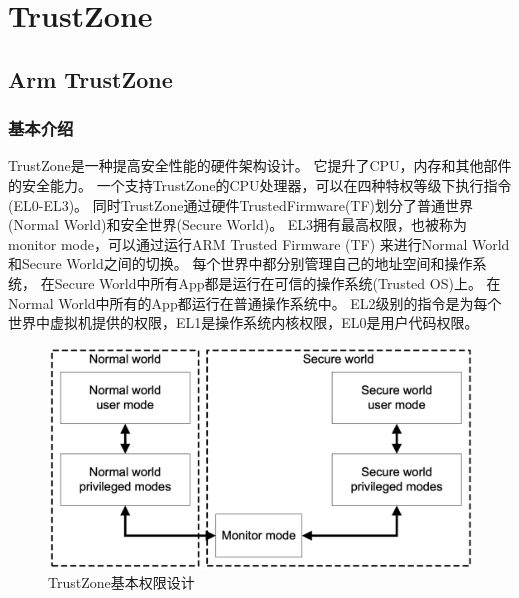 
\chapter{TrustZone} %

\label{Chapter2} %


%



\section{Arm TrustZone}

\subsection{基本介绍} 
TrustZone是一种提高安全性能的硬件架构设计。
它提升了CPU，内存和其他部件的安全能力。
一个支持TrustZone的CPU处理器，可以在四种特权等级下执行指令(EL0-EL3)。
同时TrustZone通过硬件TrustedFirmware(TF)划分了普通世界(Normal World)和安全世界(Secure World)。
EL3拥有最高权限，也被称为monitor mode，可以通过运行ARM Trusted Firmware (TF) 来进行Normal World和Secure World之间的切换。
每个世界中都分别管理自己的地址空间和操作系统，
在Secure World中所有App都是运行在可信的操作系统(Trusted OS)上。
在Normal World中所有的App都运行在普通操作系统中。
EL2级别的指令是为每个世界中虚拟机提供的权限，EL1是操作系统内核权限，EL0是用户代码权限。


\begin{figure}
    \centering
    \includegraphics[scale=0.45]{Figures/trustzone/trustzone.png}
    \decoRule
    \caption{TrustZone基本权限设计}
    \label{fig:trustzone}
\end{figure}

